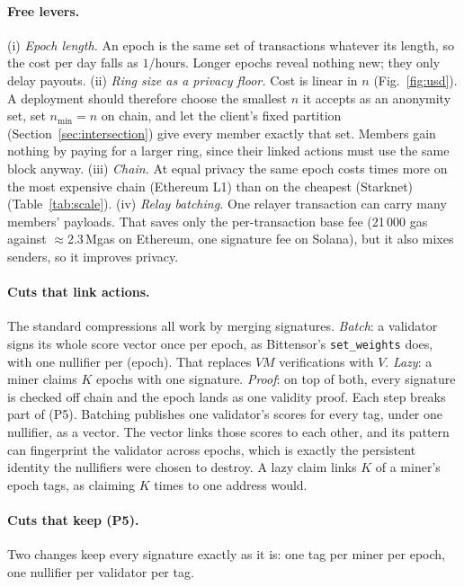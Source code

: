 \documentclass[11pt]{article}
\theoremstyle{remark}
\begin{document}
\paragraph{Free levers.} (i) \emph{Epoch length.} An epoch is the same set of transactions whatever its length, so the cost per day falls as $1/\text{hours}$. Longer epochs reveal nothing new; they only delay payouts. (ii) \emph{Ring size as a privacy floor.} Cost is linear in $n$ (Fig.~\ref{fig:usd}). A deployment should therefore choose the smallest $n$ it accepts as an anonymity set, set $n_{\min}=n$ on chain, and let the client's fixed partition (Section~\ref{sec:intersection}) give every member exactly that set. Members gain nothing by paying for a larger ring, since their linked actions must use the same block anyway. (iii) \emph{Chain.} At equal privacy the same epoch costs \scaleChainSpread{} times more on the most expensive chain (Ethereum L1) than on the cheapest (Starknet) (Table~\ref{tab:scale}). (iv) \emph{Relay batching.} One relayer transaction can carry many members' payloads. That saves only the per-transaction base fee (21\,000 gas against $\approx$2.3\,Mgas on Ethereum, one signature fee on Solana), but it also mixes senders, so it improves privacy.

\paragraph{Cuts that link actions.} The standard compressions all work by merging signatures.
\emph{Batch}: a validator signs its whole score vector once per epoch, as Bittensor's \texttt{set\_weights} does, with one nullifier per (epoch). That replaces $VM$ verifications with $V$. \emph{Lazy}: a miner claims $K$ epochs with one signature. \emph{Proof}: on top of both, every signature is checked off chain and the epoch lands as one validity proof. Each step breaks part of (P5). Batching publishes one validator's scores for every tag, under one nullifier, as a vector. The vector links those scores to each other, and its pattern can fingerprint the validator across epochs, which is exactly the persistent identity the nullifiers were chosen to destroy. A lazy claim links $K$ of a miner's epoch tags, as claiming $K$ times to one address would.

\paragraph{Cuts that keep (P5).} Two changes keep every signature exactly as it is: one tag per miner per epoch, one nullifier per validator per tag.
\end{document}
